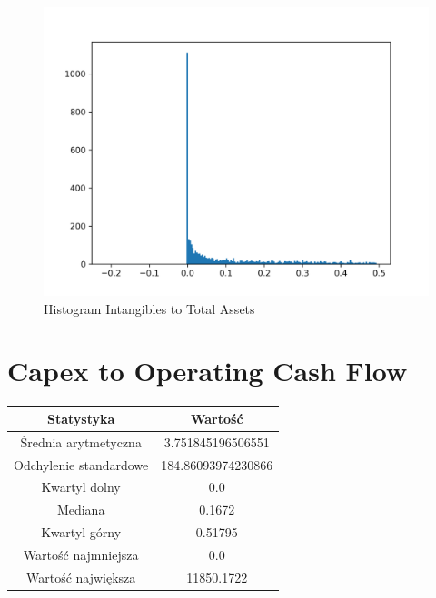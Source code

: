 \documentclass{article}
\begin{document}
\begin{figure}[h!]
    \includegraphics[width=\linewidth]{variables/Intangibles to Total Assets.png}
    \caption{Histogram Intangibles to Total Assets }
\end{figure}\section{ Capex to Operating Cash Flow }

\begin{center}
    \begin{tabular}{|c | c|} 
    \hline
    Statystyka & Wartość \\
    \hline\hline
    Średnia arytmetyczna & 3.751845196506551 \\ 
    \hline
    Odchylenie standardowe & 184.86093974230866 \\
    \hline
    Kwartyl dolny & 0.0 \\
    \hline
    Mediana & 0.1672 \\
    \hline
    Kwartyl górny & 0.51795 \\
    \hline
    Wartość najmniejsza & 0.0 \\
    \hline
    Wartość największa & 11850.1722 \\
    \hline
   \end{tabular}
\end{center}
\end{document}
